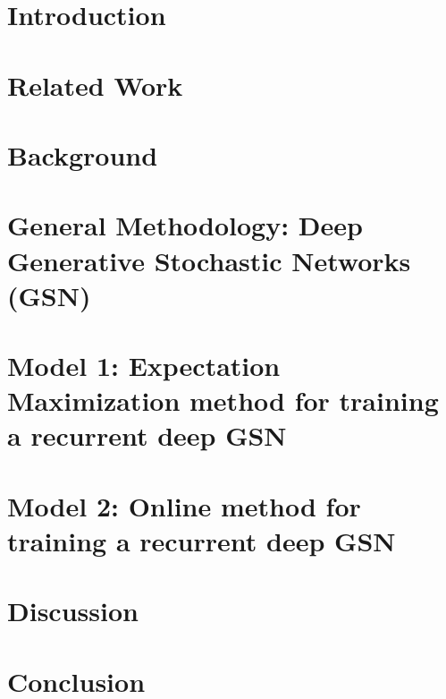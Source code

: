 \documentclass[12pt, titlepage]{report}
\begin{document}
	\tableofcontents
	\listoftables
	\listoffigures
	
	\chapter{Introduction}
	
	
	\chapter{Related Work}
	
	
	\chapter{Background}
	
	
	\chapter{General Methodology: Deep Generative Stochastic Networks (GSN)}
	
	
	\chapter{Model 1: Expectation Maximization method for training a recurrent deep GSN}
	
	
	\chapter{Model 2: Online method for training a recurrent deep GSN}	
	
	
	\chapter{Discussion}
	
	
	\chapter{Conclusion}
	
	
	

	
	
\end{document}
